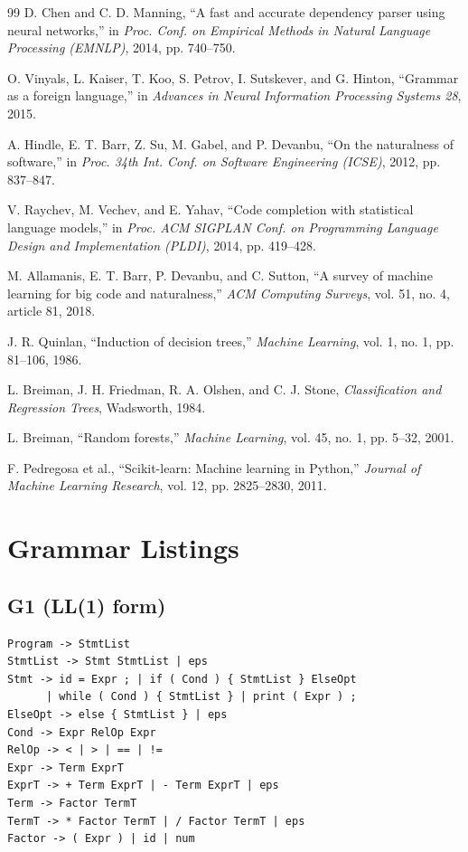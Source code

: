 \documentclass[12pt,a4paper]{article}
\begin{document}
\begin{thebibliography}{99}
D. Chen and C. D. Manning,
``A fast and accurate dependency parser using neural networks,''
in \textit{Proc. Conf. on Empirical Methods in Natural Language Processing
(EMNLP)}, 2014, pp. 740--750.

O. Vinyals, L. Kaiser, T. Koo, S. Petrov, I. Sutskever, and G. Hinton,
``Grammar as a foreign language,''
in \textit{Advances in Neural Information Processing Systems 28}, 2015.

A. Hindle, E. T. Barr, Z. Su, M. Gabel, and P. Devanbu,
``On the naturalness of software,''
in \textit{Proc. 34th Int. Conf. on Software Engineering (ICSE)}, 2012,
pp. 837--847.

V. Raychev, M. Vechev, and E. Yahav,
``Code completion with statistical language models,''
in \textit{Proc. ACM SIGPLAN Conf. on Programming Language Design and
Implementation (PLDI)}, 2014, pp. 419--428.

M. Allamanis, E. T. Barr, P. Devanbu, and C. Sutton,
``A survey of machine learning for big code and naturalness,''
\textit{ACM Computing Surveys}, vol. 51, no. 4, article 81, 2018.

J. R. Quinlan,
``Induction of decision trees,''
\textit{Machine Learning}, vol. 1, no. 1, pp. 81--106, 1986.

L. Breiman, J. H. Friedman, R. A. Olshen, and C. J. Stone,
\textit{Classification and Regression Trees}, Wadsworth, 1984.

L. Breiman,
``Random forests,''
\textit{Machine Learning}, vol. 45, no. 1, pp. 5--32, 2001.

F. Pedregosa et al.,
``Scikit-learn: Machine learning in Python,''
\textit{Journal of Machine Learning Research}, vol. 12, pp. 2825--2830, 2011.

\end{thebibliography}

\newpage
\appendix
\section{Grammar Listings}

\subsection{G1 (LL(1) form)}
\begin{lstlisting}[numbers=none,language={}]
Program -> StmtList
StmtList -> Stmt StmtList | eps
Stmt -> id = Expr ; | if ( Cond ) { StmtList } ElseOpt
      | while ( Cond ) { StmtList } | print ( Expr ) ;
ElseOpt -> else { StmtList } | eps
Cond -> Expr RelOp Expr
RelOp -> < | > | == | !=
Expr -> Term ExprT
ExprT -> + Term ExprT | - Term ExprT | eps
Term -> Factor TermT
TermT -> * Factor TermT | / Factor TermT | eps
Factor -> ( Expr ) | id | num
\end{lstlisting}
\end{document}
